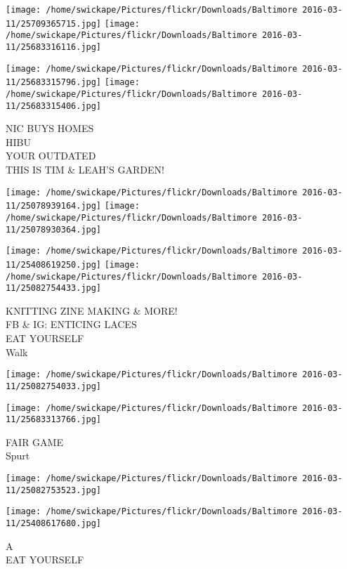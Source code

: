 \documentclass[10pt,letterpaper]{article}
\begin{document}
\texttt{[image: /home/swickape/Pictures/flickr/Downloads/Baltimore 2016-03-11/25709365715.jpg]}
\texttt{[image: /home/swickape/Pictures/flickr/Downloads/Baltimore 2016-03-11/25683316116.jpg]}

\texttt{[image: /home/swickape/Pictures/flickr/Downloads/Baltimore 2016-03-11/25683315796.jpg]}
\texttt{[image: /home/swickape/Pictures/flickr/Downloads/Baltimore 2016-03-11/25683315406.jpg]}

NIC BUYS HOMES\\
HIBU\\
YOUR OUTDATED\\
THIS IS TIM \& LEAH'S GARDEN!\\
\pagebreak

\texttt{[image: /home/swickape/Pictures/flickr/Downloads/Baltimore 2016-03-11/25078939164.jpg]}
\texttt{[image: /home/swickape/Pictures/flickr/Downloads/Baltimore 2016-03-11/25078930364.jpg]}

\texttt{[image: /home/swickape/Pictures/flickr/Downloads/Baltimore 2016-03-11/25408619250.jpg]}
\texttt{[image: /home/swickape/Pictures/flickr/Downloads/Baltimore 2016-03-11/25082754433.jpg]}

KNITTING ZINE MAKING \& MORE!\\
FB \& IG: ENTICING LACES\\
EAT YOURSELF\\
Walk\\
\pagebreak

\texttt{[image: /home/swickape/Pictures/flickr/Downloads/Baltimore 2016-03-11/25082754033.jpg]}

\vspace{0.25in}
\texttt{[image: /home/swickape/Pictures/flickr/Downloads/Baltimore 2016-03-11/25683313766.jpg]}

FAIR GAME\\
Spurt\\
\pagebreak

\texttt{[image: /home/swickape/Pictures/flickr/Downloads/Baltimore 2016-03-11/25082753523.jpg]}

\vspace{0.25in}
\texttt{[image: /home/swickape/Pictures/flickr/Downloads/Baltimore 2016-03-11/25408617680.jpg]}

A\\
EAT YOURSELF\\
\pagebreak
\end{document}
